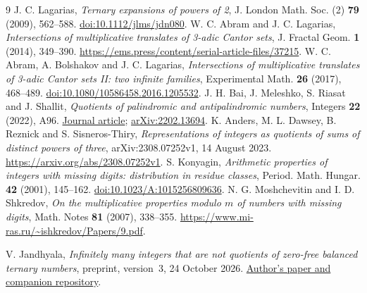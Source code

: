 \documentclass[11pt]{article}
\theoremstyle{remark}
\begin{document}
\begin{thebibliography}{9}
J. C. Lagarias,
\emph{Ternary expansions of powers of 2},
J. London Math. Soc. (2) \textbf{79} (2009), 562--588.
\href{https://doi.org/10.1112/jlms/jdn080}{doi:10.1112/jlms/jdn080}.
W. C. Abram and J. C. Lagarias,
\emph{Intersections of multiplicative translates of 3-adic Cantor sets},
J. Fractal Geom. \textbf{1} (2014), 349--390.
\url{https://ems.press/content/serial-article-files/37215}.
W. C. Abram, A. Bolshakov and J. C. Lagarias,
\emph{Intersections of multiplicative translates of 3-adic Cantor sets II:
two infinite families},
Experimental Math. \textbf{26} (2017), 468--489.
\href{https://doi.org/10.1080/10586458.2016.1205532}{doi:10.1080/10586458.2016.1205532}.
J. H. Bai, J. Meleshko, S. Riasat and J. Shallit,
\emph{Quotients of palindromic and antipalindromic numbers},
Integers \textbf{22} (2022), A96.
\href{https://math.colgate.edu/~integers/w96/w96.pdf}{Journal article};
\href{https://arxiv.org/abs/2202.13694}{arXiv:2202.13694}.
K. Anders, M. L. Dawsey, B. Reznick and S. Sisneros-Thiry,
\emph{Representations of integers as quotients of sums of distinct powers
of three}, arXiv:2308.07252v1, 14 August 2023.
\url{https://arxiv.org/abs/2308.07252v1}.
S. Konyagin,
\emph{Arithmetic properties of integers with missing digits:
distribution in residue classes},
Period. Math. Hungar. \textbf{42} (2001), 145--162.
\href{https://doi.org/10.1023/A:1015256809636}{doi:10.1023/A:1015256809636}.
N. G. Moshchevitin and I. D. Shkredov,
\emph{On the multiplicative properties modulo $m$ of numbers with missing
digits}, Math. Notes \textbf{81} (2007), 338--355.
\url{https://www.mi-ras.ru/~ishkredov/Papers/9.pdf}.

V. Jandhyala,
\emph{Infinitely many integers that are not quotients of zero-free
balanced ternary numbers}, preprint, version~3, 24 October 2026.
\href{https://github.com/jvvk/mathematics/tree/main/balanced-ternary-quotients}{Author's paper and companion repository}.
\end{thebibliography}
\end{document}
